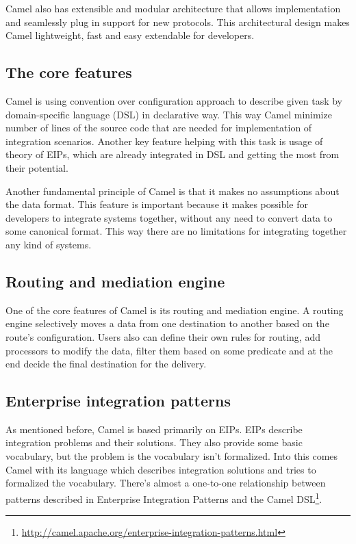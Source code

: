 \documentclass[12pt,final,oneside]{fithesis2}
\begin{document}
Camel also has extensible and modular architecture that allows implementation and seamlessly plug in support for new protocols. This architectural design makes Camel lightweight, fast and easy extendable for developers.\cite{camel-in-action}

\subsection{The core features}
Camel is using convention over configuration approach to describe given task by domain-specific language (DSL) in declarative way. This way Camel minimize number of lines of the source code that are needed for implementation of integration scenarios. Another key feature helping with this task is usage of theory of EIPs, which are already integrated in DSL and getting the most from their potential. 

Another fundamental principle of Camel is that it makes no assumptions about the data format. This feature is important because it makes possible for developers to integrate systems together, without any need to convert data to some canonical format. This way there are no limitations for integrating together any kind of systems\cite{camel-in-action}.

\subsection*{Routing and mediation engine}
One of the core features of Camel is its routing and mediation engine. A routing engine selectively moves a data from one destination to another based on the route's configuration. Users also can define their own rules for routing, add processors to modify the data, filter them based on some predicate and at the end decide the final destination for the delivery.

\subsection*{Enterprise integration patterns}
As mentioned before, Camel is based primarily on EIPs. EIPs describe integration problems and their solutions. They also provide some basic vocabulary, but the problem is the vocabulary isn't formalized. Into this comes Camel with its language which describes integration solutions and tries to formalized the vocabulary. There's almost a one-to-one relationship between patterns described in
Enterprise Integration Patterns and the Camel DSL\footnote{\url{http://camel.apache.org/enterprise-integration-patterns.html}}.
\end{document}
